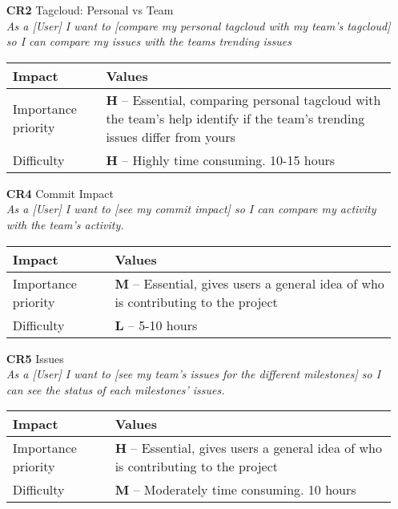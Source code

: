 \begin{itemize}
    \item[\textbf{CR2}] Tagcloud: Personal vs Team\\
        \textit{\small{As a [User] I want to [compare my personal tagcloud with my team's tagcloud] so I can compare my issues with the teams trending issues}}

        \begin{tabular}{| l | p{8cm} |}
            \hline
            \rowcolor[gray]{0.8}
            \textbf{Impact} & \textbf{Values} \\
            \hline
            Importance priority & \textbf{H} -- Essential, comparing personal tagcloud with the team's help identify if the team's trending issues differ from yours\\
            Difficulty & \textbf{H} -- Highly time consuming. 10-15 hours\\
            \hline
        \end{tabular}
    \vspace{0.5cm}

    \item[\textbf{CR4}] Commit Impact\\
        \textit{\small{As a [User] I want to [see my commit impact] so I can compare my activity with the team's activity.}}

        \begin{tabular}{| l | p{8cm} |}
            \hline
            \rowcolor[gray]{0.8}
            \textbf{Impact} & \textbf{Values} \\
            \hline
            Importance priority & \textbf{M} -- Essential, gives users a general idea of who is contributing to the project\\
            Difficulty & \textbf{L} -- 5-10 hours\\
            \hline
        \end{tabular}
    \vspace{0.5cm}

    \item[\textbf{CR5}] Issues\\
        \textit{\small{As a [User] I want to [see my team's issues for the different milestones] so I can see the status of each milestones' issues.}}

        \begin{tabular}{| l | p{8cm} |}
            \hline
            \rowcolor[gray]{0.8}
            \textbf{Impact} & \textbf{Values} \\
            \hline
            Importance priority & \textbf{H} -- Essential, gives users a general idea of who is contributing to the project\\
            Difficulty & \textbf{M} -- Moderately time consuming. 10 hours\\
            \hline
        \end{tabular}
    \vspace{0.5cm}


\end{itemize}
